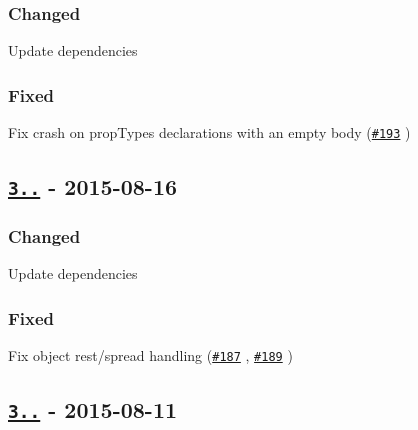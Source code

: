 \subsubsection*{Changed}


\begin{DoxyItemize}
\item Update dependencies
\end{DoxyItemize}

\subsubsection*{Fixed}


\begin{DoxyItemize}
\item Fix crash on prop\+Types declarations with an empty body (\href{https://github.com/yannickcr/eslint-plugin-react/pull/193}{\tt \#193} )
\end{DoxyItemize}

\subsection*{\href{https://github.com/yannickcr/eslint-plugin-react/compare/v3.2.2...v3.2.3}{\tt 3..} -\/ 2015-\/08-\/16}

\subsubsection*{Changed}


\begin{DoxyItemize}
\item Update dependencies
\end{DoxyItemize}

\subsubsection*{Fixed}


\begin{DoxyItemize}
\item Fix object rest/spread handling (\href{https://github.com/yannickcr/eslint-plugin-react/pull/187}{\tt \#187} , \href{https://github.com/yannickcr/eslint-plugin-react/pull/189}{\tt \#189} )
\end{DoxyItemize}

\subsection*{\href{https://github.com/yannickcr/eslint-plugin-react/compare/v3.2.1...v3.2.2}{\tt 3..} -\/ 2015-\/08-\/11}

